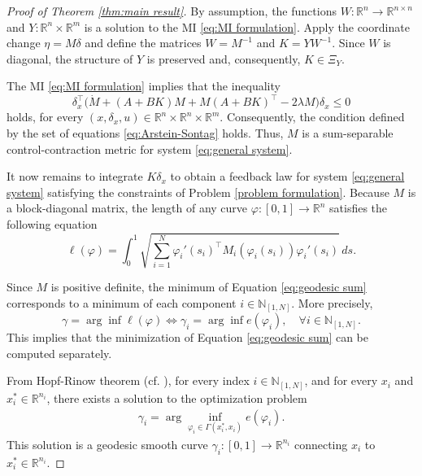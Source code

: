 \documentclass[10pt,twocolumn,twoside]{IEEEtran}
\theoremstyle{plain}
\theoremstyle{definition}
\theoremstyle{remark}
\begin{document}
\begin{proof}[Proof of Theorem \ref{thm:main result}]
	By assumption, the functions $W:\mathbb{R}^n\to\mathbb{R}^{n\times n}$ and $Y:\mathbb{R}^n\times\mathbb{R}^m$ is a solution to the MI \eqref{eq:MI formulation}. Apply the coordinate change $\eta=M\delta$ and define the matrices $W=M^{-1}$ and $K=YW^{-1}$. Since $W$ is diagonal, the structure of $Y$ is preserved and, consequently, $K\in\Xi_Y$.
	
	The MI \eqref{eq:MI formulation} implies that the inequality
	\begin{equation*}
		\delta_x^\top\bigg(\dot{M}+(A+BK)M+M(A+BK)^\top-2\lambda M\bigg)\delta_x\leq0
	\end{equation*}
	holds, for every $(x,\delta_x,u)\in\mathbb{R}^n\times\mathbb{R}^n\times\mathbb{R}^m$. Consequently, the condition defined by the set of equations \eqref{eq:Arstein-Sontag} holds. Thus, $M$ is a sum-separable control-contraction metric for system \eqref{eq:general system}.
	
	It now remains to integrate $K\delta_x$ to obtain a feedback law for system \eqref{eq:general system} satisfying the constraints of Problem \ref{problem formulation}. Because $M$ is a block-diagonal matrix, the length of any curve $\varphi:[0,1]\to\mathbb{R}^n$ satisfies the following equation
	\begin{equation}\label{eq:geodesic sum}
		\ell(\varphi)=\int_0^1\sqrt{\sum_{i=1}^N \varphi_i'(s_i)^\top M_i(\varphi_i(s_i))\varphi_i'(s_i)}\,ds.
	\end{equation}

	
	Since $M$ is positive definite, the minimum of Equation \eqref{eq:geodesic sum} corresponds to a minimum of each component $i\in\mathbb{N}_{[1,N]}$. More precisely, 
	\begin{equation*}
		\gamma=\arg\inf\ell(\varphi)\Leftrightarrow\gamma_i=\arg\inf e(\varphi_i),\quad\forall i\in\mathbb{N}_{[1,N]}.
	\end{equation*}
	This implies that the minimization of Equation \eqref{eq:geodesic sum} can be computed separately. 
	
	From Hopf-Rinow theorem (cf. \cite[Theorem 7.7]{Boothby1986}), for every index $i\in\mathbb{N}_{[1,N]}$, and for every $x_i$ and $x_i^\ast\in\mathbb{R}^{n_i}$, there exists a solution to the optimization problem
	\begin{align*}
		\gamma_i=\arg\inf_{\varphi_i\in\Gamma(x_i^\ast,x_i)} e(\varphi_i).
	\end{align*}
	This solution is a geodesic smooth curve $\gamma_i:[0,1]\to\mathbb{R}^{n_i}$ connecting $x_i$ to $x_i^\ast\in\mathbb{R}^{n_i}$. 
	

\end{proof}
\end{document}
